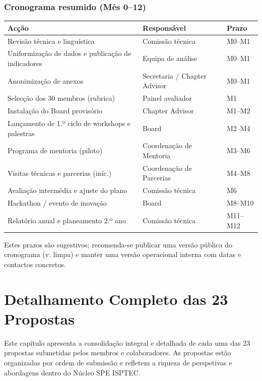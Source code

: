 \documentclass[12pt,a4paper]{article}
\begin{document}
\subsubsection*{Cronograma resumido (Mês 0–12)}
\begin{center}
\begin{tabular}{p{7.4cm} p{3.5cm} p{2.5cm}}
\toprule
Acção & Responsável & Prazo \\
\midrule
Revisão técnica e linguística & Comissão técnica & M0–M1 \\
Uniformização de dados e publicação de indicadores & Equipa de análise & M0–M1 \\
Anonimização de anexos & Secretaria / Chapter Advisor & M0–M1 \\
Selecção dos 30 membros (rubrica) & Painel avaliador & M1 \\
Instalação do Board provisório & Chapter Advisor & M1–M2 \\
Lançamento de 1.º ciclo de workshops e palestras & Board & M2–M4 \\
Programa de mentoria (piloto) & Coordenação de Mentoria & M3–M6 \\
Visitas técnicas e parcerias (iníc.) & Coordenação de Parcerias & M4–M8 \\
Avaliação intermédia e ajuste do plano & Comissão técnica & M6 \\
Hackathon / evento de inovação & Board & M8–M10 \\
Relatório anual e planeamento 2.º ano & Comissão técnica & M11–M12 \\
\bottomrule
\end{tabular}
\end{center}

\smallskip
\noindent Estes prazos são sugestivos; recomenda-se publicar uma versão pública do cronograma (v. limpa) e manter uma versão operacional interna com datas e contactos concretos.

\newpage


\section{Detalhamento Completo das 23 Propostas}

\noindent Este capítulo apresenta a consolidação integral e detalhada de cada uma das 23 propostas submetidas pelos membros e colaboradores. As propostas estão organizadas por ordem de submissão e refletem a riqueza de perspetivas e abordagens dentro do Núcleo SPE ISPTEC.
\end{document}
